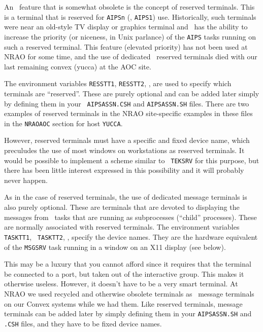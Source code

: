 
An \AIPS\ feature that is somewhat obsolete is the concept of reserved
terminals.  This is a terminal that is reserved for {\tt AIPSn} (\eg,
{\tt AIPS1}) use.  Historically, such terminals were near an old-style
TV display or graphics terminal and \AIPS\ has the ability to increase
the priority (or niceness, in Unix parlance) of the {\tt AIPS} tasks
running on such a reserved terminal.  This feature (elevated priority)
has not been used at NRAO for some time, and the use of dedicated \AIPS\
reserved terminals died with our last remaining convex (yucca) at
the AOC site.

The environment variables {\tt RESSTT1}, {\tt RESSTT2}, \etc, are used
to specify which terminals are ``reserved''.  These are purely optional
and can be added later simply by defining them in your {\tt
AIPSASSN.CSH} and {\tt AIPSASSN.SH} files.  There are two examples of
reserved terminals in the NRAO site-specific examples in these files in
the {\tt NRAOAOC} section for host {\tt YUCCA}.

However, reserved terminals must have a specific and fixed device name,
which preculudes the use of most windows on workstations as reserved
terminals.  It would be possible to implement a scheme similar to {\tt
TEKSRV} for this purpose, but there has been little interest expressed
in this possibility and it will probably never happen. \medskip


As in the case of reserved terminals, the use of dedicated message
terminals is also purely optional.  These are terminals that are devoted
to displaying the messages from \AIPS\ tasks that are running as
subprocesses (``child'' processes).  These are normally associated with
reserved terminals.  The environment variables {\tt TASKTT1}, {\tt
TASKTT2}, \etc, specify the device names.  They are the hardware
equivalent of the {\tt MSGSRV} task running in a window on an X11
display (see below).

This may be a luxury that you cannot afford since it requires that the
terminal be connected to a port, but taken out of the interactive group.
This makes it otherwise useless.  However, it doesn't have to be a very
smart terminal.  At NRAO we used recycled and otherwise obsolete
terminals as \AIPS\ message terminals on our Convex systems while we had
them.  Like reserved terminals, message terminals can be added later by
simply defining them in your {\tt AIPSASSN.SH} and {\tt .CSH} files,
and they have to be fixed device names.

